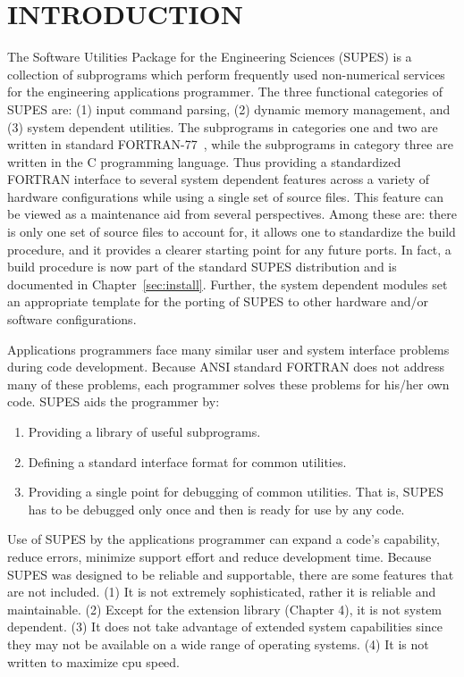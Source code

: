 \chapter{INTRODUCTION}
The Software Utilities Package for the Engineering
Sciences (SUPES) is a collection of subprograms which perform frequently
used non-numerical services for the engineering applications programmer.
The
three functional categories of SUPES are: (1) input command parsing, (2) dynamic
memory management, and (3) system dependent utilities.  The subprograms in
categories one and two are written in standard FORTRAN-77~\cite{ansi},
while the subprograms
in category three are written in the C programming language.
Thus providing a standardized FORTRAN interface to
several system dependent features across a variety of hardware configurations
while using a single set of source files.
This feature can be viewed as a maintenance aid from
several perspectives.
Among these are:
there is only one set of source files to account for,
it allows one to standardize the build procedure,
and it provides a clearer starting point for any future ports.
In fact,
a build procedure is now part of the standard SUPES distribution and
is documented in Chapter~\ref{sec:install}.
Further,
the system dependent modules set an appropriate template for the
porting of SUPES to other hardware and/or software configurations.

Applications programmers face many similar user and system interface problems
during code development.  Because ANSI standard FORTRAN does not address many of
these problems, each programmer solves these problems for his/her own code.
SUPES aids the programmer by:
\begin{enumerate}

\item Providing a library of useful subprograms.

\item Defining a standard interface format for common utilities.

\item Providing a single point for debugging of common utilities.  That
is, SUPES has to be debugged only once and then is ready for use
by any code.
\end{enumerate}

Use of SUPES by the applications programmer can expand a code's capability,
reduce errors, minimize support effort and reduce development time.  Because
SUPES was designed to be reliable and supportable, there are some features
that are not included.  (1) It is not extremely sophisticated, rather it is
reliable and maintainable.  (2) Except for the extension library (Chapter
4), it is not system dependent.  (3) It does not take advantage of extended
system capabilities since they may not be available on a wide range of
operating systems.  (4) It is not written to maximize cpu speed.

